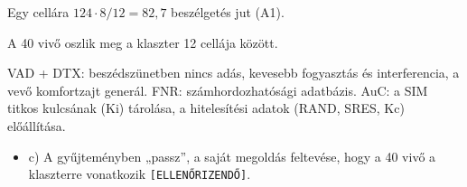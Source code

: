 Egy cellára $124\cdot8/12=82{,}7$ beszélgetés jut (A1).

\begin{center}\end{center}

A 40 vivő oszlik meg a klaszter 12 cellája között.

\begin{center}\end{center}

VAD + DTX: beszédszünetben nincs adás, kevesebb fogyasztás és interferencia, a vevő komfortzajt generál. FNR: számhordozhatósági adatbázis. AuC: a SIM titkos kulcsának (Ki) tárolása, a hitelesítési adatok (RAND, SRES, Kc) előállítása.
\begin{eredmeny}

\begin{center}\end{center}
\end{eredmeny}
\begin{tipp}[Ellenőrzés]
\begin{itemize}
\item c) A gyűjteményben „passz”, a saját megoldás feltevése, hogy a 40 vivő a klaszterre vonatkozik \texttt{[ELLENŐRIZENDŐ]}.
\end{itemize}
\end{tipp}



